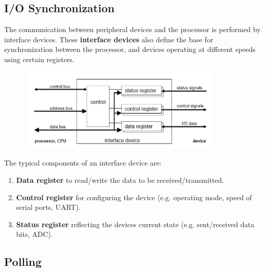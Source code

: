 \subsection{I/O Synchronization}

The communication between peripheral devices and the processor is performed by interface devices. These \textbf{interface devices} also define the base for synchronization between the processor, and devices operating at different speeds using certain registers.

 	\begin{figure}[h]
    \centering
    \includegraphics[width=10cm, height=4cm]{Images/image122.png}
    \label{fig:Fig 71}
    \end{figure}

The typical components of an interface device are:

\begin{enumerate}
	\item  \textbf{Data register} to read/write the data to be received/transmitted.
	\item  \textbf{Control register} for configuring the device (e.g. operating mode, speed of serial ports, UART).
	\item  \textbf{Status register} reflecting the devices current state (e.g. sent/received data bits, ADC).
\end{enumerate}


\subsection{Polling}

